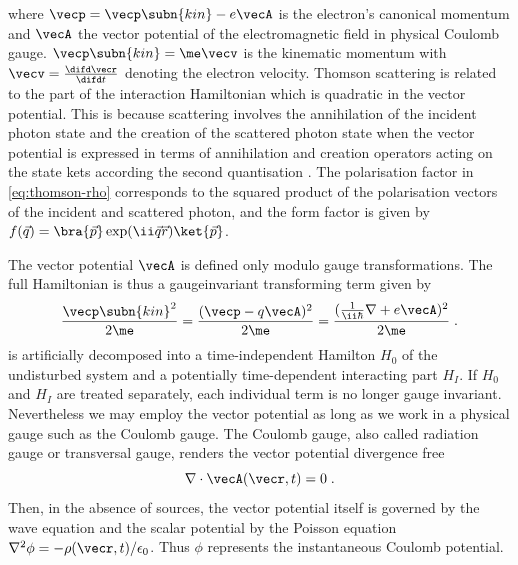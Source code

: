 \documentclass[
twoside,
openright,
titlepage,
numbers=noenddot,
headinclude,
fleqn,
a4paper,
footinclude=true,
cleardoublepage=empty,
abstractoff,
BCOR=5mm,
paper=a4,
fontsize=11pt,
british,ngerman,american,
]{scrreprt}
\begin{document}
where $\vecp=\vecp\subn{kin}-e\vecA$ is the electron's canonical
momentum and $\vecA$ the vector potential of the electromagnetic field
in physical Coulomb gauge.  $\vecp\subn{kin} = \me\vecv$ is the
kinematic momentum with $\vecv=\frac{\difd\vecr}{\difd t}$ denoting
the electron velocity.  Thomson scattering is related to the part of
the interaction Hamiltonian which is quadratic in the vector
potential.  This is because scattering involves the annihilation of
the incident photon state and the creation of the scattered photon
state when the vector potential is expressed in terms of annihilation
and creation operators acting on the state kets according the second
quantisation \cite{Ryder1996}.  The polarisation factor in
\cref{eq:thomson-rho} corresponds to the squared product of the
polarisation vectors of the incident and scattered photon, and the
form factor is given by
$f(\vec{q})=\bra{\vec{p}}\exp(\ii\vec{q}\vec{r})\ket{\vec{p}}$.

The vector potential $\vecA$ is defined only modulo gauge
transformations.  The full Hamiltonian is thus a gauge\hyph invariant
transforming term given by
\begin{equation}
  \label{eq:full-hamiltonian}
  \frac{\vecp\subn{kin}^2}{2\me} = 
  \frac{(\vecp -q\vecA)^2}{2\me} = 
    \frac{(\frac{1}{\ii\hbar}\nabla + e\vecA)^2}{2\me} \;.
\end{equation}
 is artificially decomposed into a
time-independent Hamilton $H_0$ of the undisturbed system and a
potentially time-dependent interacting part $H_I$.  If $H_0$ and $H_I$
are treated separately, each individual term is no longer gauge
invariant.  Nevertheless we may employ the vector potential as long as
we work in a physical gauge such as the Coulomb gauge.  The Coulomb
gauge, also called radiation gauge or transversal gauge, renders the
vector potential divergence free
\begin{equation}
  \label{eq:coulomb-gauge}
  \nabla\cdot\vecA(\vecr,t) = 0 \;.
\end{equation}
Then, in the absence of sources, the vector potential itself is
governed by the wave equation and the scalar potential by the Poisson
equation $\nabla^2\phi=-\rho(\vecr,t)/\epsilon_0$.  Thus $\phi$
represents the instantaneous Coulomb potential. %
\end{document}

